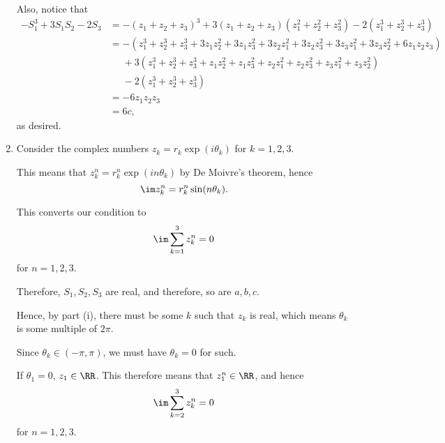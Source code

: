 \begin{enumerate}
          Also, notice that
          \begin{align*}
              -S_1^3 + 3 S_1 S_2 - 2 S_3 & = - (z_1 + z_2 + z_3)^3 + 3 (z_1 + z_2 + z_3) (z_1^2 + z_2^2 + z_3^2) - 2(z_1^3 + z_2^3 + z_3^3)                             \\
                                         & = -(z_1^3 + z_2^3 + z_3^3 + 3z_1 z_2^2 + 3z_1 z_3^2 + 3 z_2 z_1^2 + 3 z_2 z_3^2 + 3 z_3 z_1^2 + 3 z_3 z_2^2 + 6 z_1 z_2 z_3) \\
                                         & \phantom{=} + 3(z_1^3 + z_2^3 + z_3^3 + z_1 z_2^2 + z_1 z_3^2 + z_2 z_1^2 + z_2 z_3^2 + z_3 z_1^2 + z_3 z_2^2)               \\
                                         & \phantom{=} - 2(z_1^3 + z_2^3 + z_3^3)                                                                                       \\
                                         & = -6 z_1 z_2 z_3                                                                                                             \\
                                         & = 6c,
          \end{align*}
          as desired.

    \item Consider the complex numbers \(z_k = r_k \exp (i \theta_k)\) for \(k = 1, 2, 3\).

          This means that \(z_k^n = r_k^n \exp (i n \theta_k)\) by De Moivre's theorem, hence
          \[
              \im z_k^n = r_k^n \sin (n \theta_k).
          \]

          This converts our condition to
          \begin{align*}
              \im \sum_{k = 1}^{3} z_k^n = 0
          \end{align*}
          for \(n = 1, 2, 3\).

          Therefore, \(S_1, S_2, S_3\) are real, and therefore, so are \(a, b, c\).

          Hence, by part (i), there must be some \(k\) such that \(z_k\) is real, which means \(\theta_k\) is some multiple of \(2\pi\).

          Since \(\theta_k \in (-\pi, \pi)\), we must have \(\theta_k = 0\) for such.

          If \(\theta_1 = 0\), \(z_1 \in \RR\). This therefore means that \(z_1^n \in \RR\), and hence
          \[
              \im \sum_{k = 2}^{3} z_k^n = 0
          \]
          for \(n = 1, 2, 3\).


\end{enumerate}

